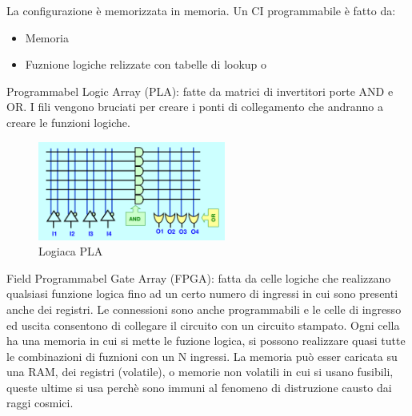 \documentclass[12pt]{article}
\begin{document}
La configurazione \`e memorizzata in memoria. Un CI programmabile \`e fatto da:
\begin{itemize}
    \item Memoria
    \item Fuznione logiche relizzate con tabelle di lookup o 
\end{itemize}

Programmabel Logic Array (PLA): fatte da matrici di invertitori porte AND e OR. I fili vengono bruciati per creare i ponti di collegamento che andranno a creare le funzioni logiche.
\begin{figure}[H]
    \centering
    \includegraphics[width=0.55\textwidth]{pla-logic.png}
    \caption{Logiaca PLA}
    \label{fig:pla-logig}
\end{figure}

Field Programmabel Gate Array (FPGA): fatta da celle logiche che realizzano qualsiasi funzione logica fino ad un certo numero di ingressi in cui sono presenti anche dei registri. Le connessioni sono anche programmabili e le celle di ingresso ed uscita consentono di collegare il circuito con un circuito stampato. Ogni cella ha una memoria in cui si mette le fuzione logica, si possono realizzare quasi tutte le combinazioni di fuznioni con un N ingressi. La memoria pu\`o esser caricata su una RAM, dei registri (volatile), o memorie non volatili in cui si usano fusibili, queste ultime si usa perch\`e sono immuni al fenomeno di distruzione causto dai raggi cosmici.

\end{document}
